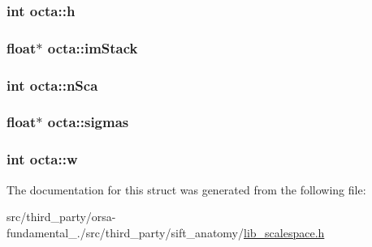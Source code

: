\subsubsection[{h}]{\setlength{\rightskip}{0pt plus 5cm}int octa\+::h}\label{structocta_a1bc350b403959f01b9457807e855da81}
\hypertarget{structocta_a2902cb4a937cc56fd61308e36f4f445b}{}
\subsubsection[{im\+Stack}]{\setlength{\rightskip}{0pt plus 5cm}float$\ast$ octa\+::im\+Stack}\label{structocta_a2902cb4a937cc56fd61308e36f4f445b}
\hypertarget{structocta_ae0d1f771d2fd9f098e46cdac8752a9b0}{}
\subsubsection[{n\+Sca}]{\setlength{\rightskip}{0pt plus 5cm}int octa\+::n\+Sca}\label{structocta_ae0d1f771d2fd9f098e46cdac8752a9b0}
\hypertarget{structocta_aceae2720d5e95a242158513e8f1b9f46}{}
\subsubsection[{sigmas}]{\setlength{\rightskip}{0pt plus 5cm}float$\ast$ octa\+::sigmas}\label{structocta_aceae2720d5e95a242158513e8f1b9f46}
\hypertarget{structocta_a8071dcf78cffd87b55e8c9f1575f5e08}{}
\subsubsection[{w}]{\setlength{\rightskip}{0pt plus 5cm}int octa\+::w}\label{structocta_a8071dcf78cffd87b55e8c9f1575f5e08}


The documentation for this struct was generated from the following file\+:\begin{DoxyCompactItemize}
\item 
src/third\+\_\+party/orsa-\/fundamental\+\_./src/third\+\_\+party/sift\+\_\+anatomy/\hyperlink{lib__scalespace_8h}{lib\+\_\+scalespace.\+h}\end{DoxyCompactItemize}
